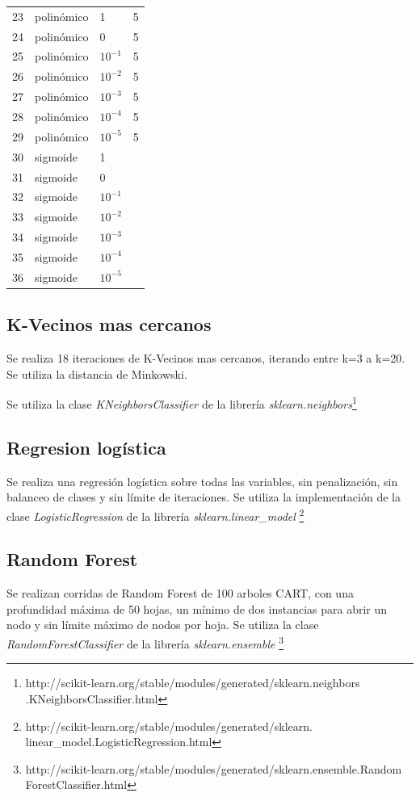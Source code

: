 \documentclass[journal]{IEEEtran}
\begin{document}
\begin{table}[ht!]
\begin{tabular}{l | l l l }
23 & polinómico & 1  & 5 \\ 
24 & polinómico & 0  & 5 \\ 
25 & polinómico & $ 10^{-1} $  & 5 \\ 
26 & polinómico & $ 10^{-2} $  & 5 \\ 
27 & polinómico & $ 10^{-3} $  & 5 \\ 
28 & polinómico & $ 10^{-4} $  & 5 \\ 
29 & polinómico & $ 10^{-5} $  & 5 \\ 
30 & sigmoide & 1 &  \\ 
31 & sigmoide & 0 &  \\ 
32 & sigmoide & $ 10^{-1} $ &  \\ 
33 & sigmoide & $ 10^{-2} $ &  \\ 
34 & sigmoide & $ 10^{-3} $ &  \\ 
35 & sigmoide & $ 10^{-4} $ &  \\ 
36 & sigmoide & $ 10^{-5} $ &  \\ 
\end{tabular}
\end{table}

\subsection{K-Vecinos mas cercanos}
Se realiza 18 iteraciones de K-Vecinos mas cercanos, iterando entre k=3
a k=20. Se utiliza la distancia de Minkowski.

Se utiliza la clase \textit{KNeighborsClassifier} de la librería
\textit{sklearn.neighbors}\footnote
{http://scikit-learn.org/stable/modules/generated/sklearn.neighbors
.KNeighborsClassifier.html}

\subsection{Regresion logística}
Se realiza una regresión logística sobre todas las variables, sin penalización,
sin balanceo de clases y sin límite de iteraciones. Se utiliza la
implementación de la clase \textit{LogisticRegression} de la librería
\textit{sklearn.linear\_model}
\footnote{http://scikit-learn.org/stable/modules/generated/sklearn.
linear\_model.LogisticRegression.html}

\subsection{Random Forest}
Se realizan corridas de Random Forest de 100 arboles CART, con una 
profundidad máxima de 50 hojas, un mínimo de dos instancias para abrir
un nodo y sin límite máximo de nodos por hoja. Se utiliza la clase
\textit{RandomForestClassifier} de la librería \textit{sklearn.ensemble}
\footnote{http://scikit-learn.org/stable/modules/generated/sklearn.ensemble.Random
ForestClassifier.html}
\end{document}
